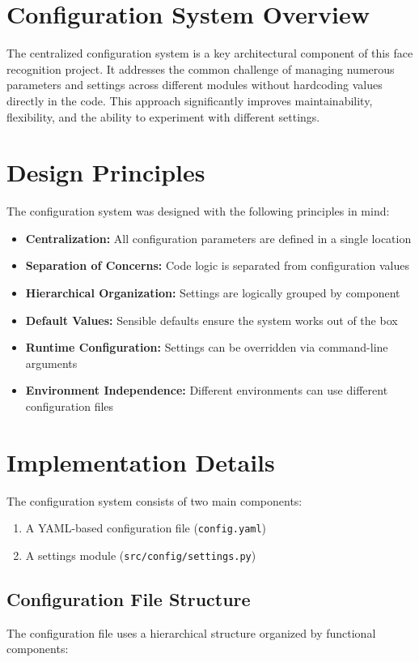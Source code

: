 \section{Configuration System Overview}
The centralized configuration system is a key architectural component of this face recognition project. It addresses the common challenge of managing numerous parameters and settings across different modules without hardcoding values directly in the code. This approach significantly improves maintainability, flexibility, and the ability to experiment with different settings.

\section{Design Principles}
The configuration system was designed with the following principles in mind:
\begin{itemize}
    \item \textbf{Centralization:} All configuration parameters are defined in a single location
    \item \textbf{Separation of Concerns:} Code logic is separated from configuration values
    \item \textbf{Hierarchical Organization:} Settings are logically grouped by component
    \item \textbf{Default Values:} Sensible defaults ensure the system works out of the box
    \item \textbf{Runtime Configuration:} Settings can be overridden via command-line arguments
    \item \textbf{Environment Independence:} Different environments can use different configuration files
\end{itemize}

\section{Implementation Details}
The configuration system consists of two main components:
\begin{enumerate}
    \item A YAML-based configuration file (\texttt{config.yaml})
    \item A settings module (\texttt{src/config/settings.py})
\end{enumerate}

\subsection{Configuration File Structure}
The configuration file uses a hierarchical structure organized by functional components:

